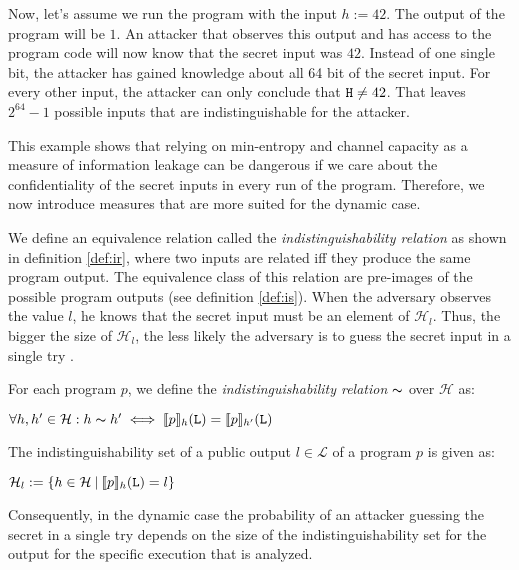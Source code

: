 Now, let's assume we run the program with the input $h := 42$. The output of the program will be $1$. An attacker that observes this output and has access to the program code will now know that the secret input was $42$. Instead of one single bit, the attacker has gained knowledge about all 64 bit of the secret input. For every other input, the attacker can only conclude that $\mathtt{H} \neq 42$. That leaves $2^{64} - 1$ possible inputs that are indistinguishable for the attacker. 

This example shows that relying on min-entropy and channel capacity as a measure of information leakage can be dangerous if we care about the confidentiality of the secret inputs in every run of the program. Therefore, we now introduce measures that are more suited for the dynamic case.

We define an equivalence relation called the \emph{indistinguishability relation} as shown in definition \ref{def:ir}, where two inputs are related iff they produce the same program output. The equivalence class of this relation are pre-images of the possible program outputs (see definition \ref{def:is}). When the adversary observes the value $l$, he knows that the secret input must be an element of $\mathcal{H}_l$. Thus, the bigger the size of $\mathcal{H}_l$, the less likely the adversary is to guess the secret input in a single try \cite{backes09, smith09, alvim19}. 

\begin{definition}\label{def:ir}
        For each program $p$, we define the \emph{indistinguishability relation} $\thicksim$ over $\mathcal{H}$ as:
        \begin{center}
            $\forall h, h' \in \mathcal{H}: h \thicksim  h' \iff \llbracket p \rrbracket_h(\mathtt{L}) = \llbracket p \rrbracket_{h'}(\mathtt{L})$
        \end{center}
\end{definition}

\begin{definition}\label{def:is}
    The indistinguishability set of a public output $l \in \mathcal{L}$ of a program $p$ is given as:
    \begin{center}
        $\mathcal{H}_l :=\{ h \in \mathcal{H} \: | \: \llbracket p \rrbracket_h(\mathtt{L}) = l \}$
    \end{center}
\end{definition}

Consequently, in the dynamic case the probability of an attacker guessing the secret in a single try depends on the size of the indistinguishability set for the output for the specific execution that is analyzed.


